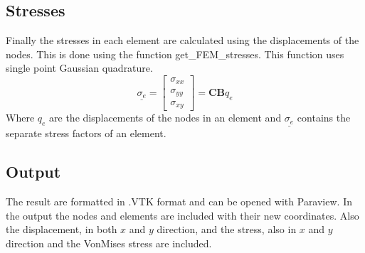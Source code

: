 \subsection{Stresses}
Finally the stresses in each element are calculated using the displacements of the nodes. This is done using the function get\_FEM\_stresses. This function uses single point Gaussian quadrature. 
\begin{equation}
\underline{\sigma_e}=\begin{bmatrix}
\sigma_{xx}\\
\sigma_{yy}\\
\sigma_{xy}
\end{bmatrix}=\mathbf{C} \mathbf{B} q_e
\end{equation}
Where $q_e$ are the displacements of the nodes in an element and $\underline{\sigma_e}$ contains the separate stress factors of an element.
\subsection{Output}
The result are formatted in .VTK format and can be opened with Paraview. In the output the nodes and elements are included with their new coordinates. Also the displacement, in both $x$ and $y$ direction, and the stress, also in $x$ and $y$ direction and the VonMises stress are included. 
